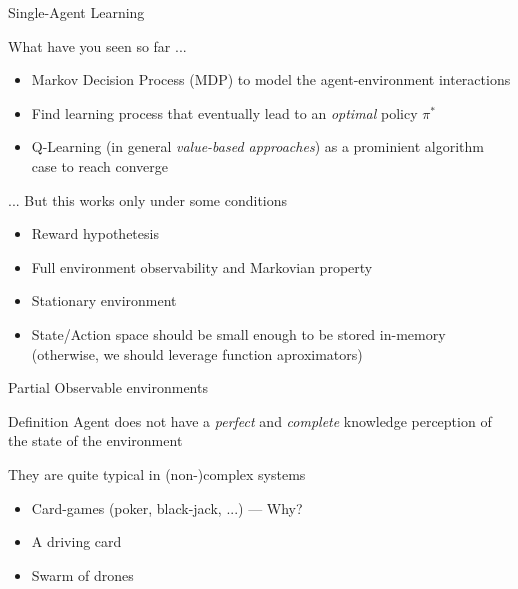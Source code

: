 \documentclass[presentation]{beamer}\mode<presentation>{\usetheme{AMSBolognaFC}}
\begin{document}
\begin{frame}[c, fragile]{Single-Agent Learning}
\begin{exampleblock}{What have you seen so far ...}
	\begin{itemize}
		\item Markov Decision Process (MDP) to model the agent-environment interactions
		\item Find learning process that eventually lead to an \emph{optimal} policy $\pi^*$
		\item Q-Learning (in general \emph{value-based approaches}) as a prominient algorithm case to reach converge
	\end{itemize}
\end{exampleblock}
\begin{alertblock}{... But this works only under some conditions}
	\begin{itemize}
		\item Reward hypothetesis
		\item Full environment observability and Markovian property
		\item Stationary environment
		\item State/Action space should be small enough to be stored in-memory (otherwise, we should leverage function aproximators)
	\end{itemize}	
\end{alertblock}
\end{frame}
\begin{frame}{Partial Observable environments}
	\begin{alertblock}{Definition}
		Agent does not have a \emph{perfect} and \emph{complete} knowledge perception of the state of the environment
	\end{alertblock}
	\begin{exampleblock}{They are quite typical in (non-)complex systems}
		\begin{itemize}
			\item Card-games (poker, black-jack, ...) --- Why?
			\item A driving card
			\item Swarm of drones
		\end{itemize}
	\end{exampleblock}
\end{frame}
\end{document}
